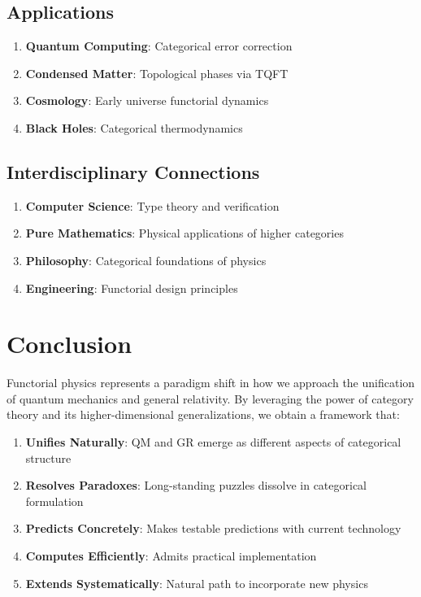 \documentclass[11pt,a4paper]{article}
\begin{document}
\subsection{Applications}

\begin{enumerate}
    \item \textbf{Quantum Computing}: Categorical error correction
    \item \textbf{Condensed Matter}: Topological phases via TQFT
    \item \textbf{Cosmology}: Early universe functorial dynamics
    \item \textbf{Black Holes}: Categorical thermodynamics
\end{enumerate}

\subsection{Interdisciplinary Connections}

\begin{enumerate}
    \item \textbf{Computer Science}: Type theory and verification
    \item \textbf{Pure Mathematics}: Physical applications of higher categories
    \item \textbf{Philosophy}: Categorical foundations of physics
    \item \textbf{Engineering}: Functorial design principles
\end{enumerate}

\section{Conclusion}

Functorial physics represents a paradigm shift in how we approach the unification of quantum mechanics and general relativity. By leveraging the power of category theory and its higher-dimensional generalizations, we obtain a framework that:

\begin{enumerate}
    \item \textbf{Unifies Naturally}: QM and GR emerge as different aspects of categorical structure
    \item \textbf{Resolves Paradoxes}: Long-standing puzzles dissolve in categorical formulation
    \item \textbf{Predicts Concretely}: Makes testable predictions with current technology
    \item \textbf{Computes Efficiently}: Admits practical implementation
    \item \textbf{Extends Systematically}: Natural path to incorporate new physics
\end{enumerate}
\end{document}
